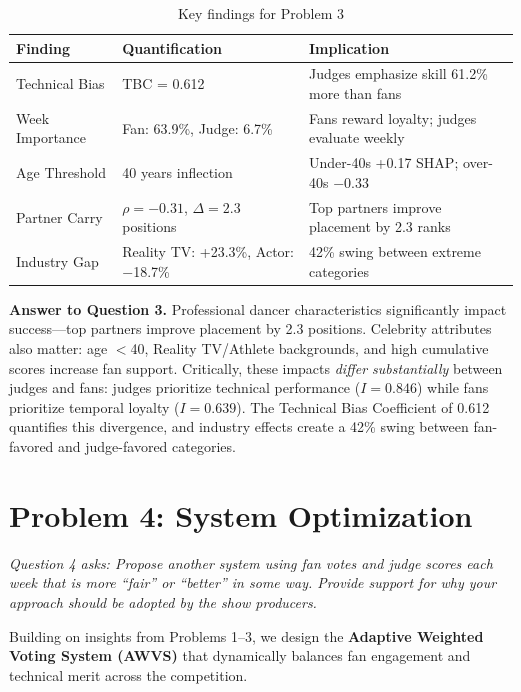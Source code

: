 \documentclass{mcmthesis}
\begin{document}
\begin{table}[h]
\centering
\caption{Key findings for Problem 3}
\begin{tabular}{l p{4.5cm} p{5.5cm}}
\toprule
Finding & Quantification & Implication \\
\midrule
Technical Bias & TBC = 0.612 & Judges emphasize skill 61.2\% more than fans \\
Week Importance & Fan: 63.9\%, Judge: 6.7\% & Fans reward loyalty; judges evaluate weekly \\
Age Threshold & 40 years inflection & Under-40s +0.17 SHAP; over-40s $-$0.33 \\
Partner Carry & $\rho = -0.31$, $\Delta = 2.3$ positions & Top partners improve placement by 2.3 ranks \\
Industry Gap & Reality TV: +23.3\%, Actor: $-$18.7\% & 42\% swing between extreme categories \\
\bottomrule
\end{tabular}
\end{table}

\textbf{Answer to Question 3.} Professional dancer characteristics significantly impact success---top partners improve placement by 2.3 positions. Celebrity attributes also matter: age $<$40, Reality TV/Athlete backgrounds, and high cumulative scores increase fan support. Critically, these impacts \textit{differ substantially} between judges and fans: judges prioritize technical performance ($I = 0.846$) while fans prioritize temporal loyalty ($I = 0.639$). The Technical Bias Coefficient of 0.612 quantifies this divergence, and industry effects create a 42\% swing between fan-favored and judge-favored categories.


\section{Problem 4: System Optimization}

\textit{Question 4 asks: Propose another system using fan votes and judge scores each week that is more ``fair'' or ``better'' in some way. Provide support for why your approach should be adopted by the show producers.}

Building on insights from Problems 1--3, we design the \textbf{Adaptive Weighted Voting System (AWVS)} that dynamically balances fan engagement and technical merit across the competition.
\end{document}
